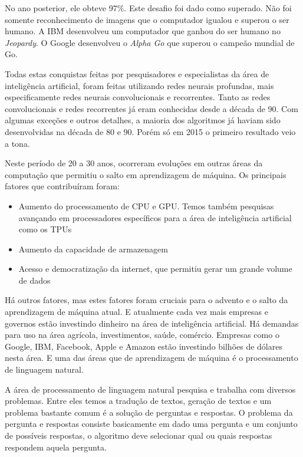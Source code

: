 No ano posterior, ele obteve 97\%. Este desafio foi dado como superado. Não foi somente reconhecimento de imagens que o computador igualou e superou o ser humano. A IBM desenvolveu um computador que ganhou do ser humano no \textit{Jeopardy}. O Google desenvolveu o \textit{Alpha Go} que superou o campeão mundial de Go.

Todas estas conquistas feitas por pesquisadores e especialistas da área de inteligência artificial, foram feitas utilizando redes neurais profundas, mais especificamente redes neurais convolucionais e recorrentes. Tanto as redes convolucionais e redes recorrentes já eram conhecidas desde a década de 90. Com algumas exceções e outros detalhes, a maioria dos algoritmos já haviam sido desenvolvidas na década de 80 e 90. Porém só em 2015 o primeiro resultado veio a tona.

Neste período de 20 a 30 anos, ocorreram evoluções em outras áreas da computação que permitiu o salto em aprendizagem de máquina. Os principais fatores que contribuíram foram:

\begin{itemize}
    \item Aumento do processamento de CPU e GPU. Temos também pesquisas avançando em processadores específicos para a área de inteligência artificial como os TPUs
    \item Aumento da capacidade de armazenagem
    \item Acesso e democratização da internet, que permitiu gerar um grande volume de dados
\end{itemize}

Há outros fatores, mas estes fatores foram cruciais para o advento e o salto da aprendizagem de máquina atual. E atualmente cada vez mais empresas e governos estão investindo dinheiro na área de inteligência artificial. Há demandas para uso na área agrícola, investimentos, saúde, comércio. Empresas como o Google, IBM, Facebook, Apple e Amazon estão investindo bilhões de dólares nesta área. E uma das áreas que de aprendizagem de máquina é o processamento de linguagem natural. 

A área de processamento de linguagem natural pesquisa e trabalha com diversos problemas. Entre eles temos a tradução de textos, geração de textos  e um problema bastante comum é a solução de perguntas e respostas. O problema da pergunta e respostas consiste basicamente em dado uma pergunta e um conjunto de possíveis respostas, o algoritmo deve selecionar qual ou quais respostas respondem aquela pergunta.

